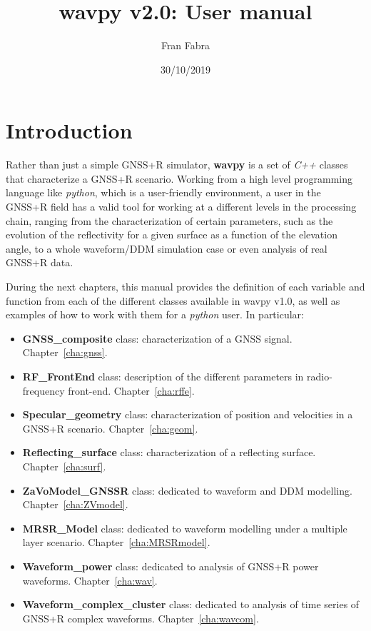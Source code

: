 \documentclass[a4paper]{GPSSIDS}
\title{wavpy v2.0: User manual}
\author{Fran Fabra}
\date{30/10/2019}
\begin{document}
\tableofcontents

\clearpage

\chapter{Introduction}

Rather than just a simple GNSS+R simulator, {\bf wavpy} is a set of {\it C++} classes that characterize a GNSS+R scenario. Working from a high level programming language like {\it python}, which is a user-friendly environment, a user in the GNSS+R field has a valid tool for working at a different levels in the processing chain, ranging from the characterization of certain parameters, such as the evolution of the reflectivity for a given surface as a function of the elevation angle, to a whole waveform/DDM simulation case or even analysis of real GNSS+R data.

During the next chapters, this manual provides the definition of each variable and function from each of the different classes available in wavpy v1.0, as well as examples of how to work with them for a {\it python} user. In particular:
\begin{itemize}
\item {\bf GNSS\_composite} class: characterization of a GNSS signal. Chapter~\ref{cha:gnss}.
\item {\bf RF\_FrontEnd} class: description of the different parameters in radio-frequency front-end. Chapter~\ref{cha:rffe}.
\item {\bf Specular\_geometry} class: characterization of position and velocities in a GNSS+R scenario. Chapter~\ref{cha:geom}.
\item {\bf Reflecting\_surface} class: characterization of a reflecting surface. Chapter~\ref{cha:surf}.
\item {\bf ZaVoModel\_GNSSR} class: dedicated to waveform and DDM modelling. Chapter~\ref{cha:ZVmodel}.
\item {\bf MRSR\_Model} class: dedicated to waveform modelling under a multiple layer scenario. Chapter~\ref{cha:MRSRmodel}.
\item {\bf Waveform\_power} class: dedicated to analysis of GNSS+R power waveforms. Chapter~\ref{cha:wav}.
\item {\bf Waveform\_complex\_cluster} class: dedicated to analysis of time series of GNSS+R complex waveforms. Chapter~\ref{cha:wavcom}.
\end{itemize}











\end{document}
